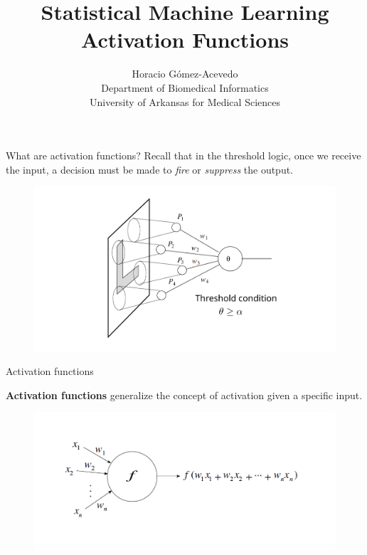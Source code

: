 \documentclass{beamer}
\title{Statistical Machine Learning\\ Activation Functions}
\author{Horacio G\'omez-Acevedo\\ Department of Biomedical Informatics\\
	University of Arkansas for Medical Sciences}
\begin{document}
	\begin{frame}[plain]
		\maketitle
	\end{frame}

\begin{frame}{What are activation functions?}
Recall that in the threshold logic,  once we receive the input, a decision must be made to \textit{fire} or \textit{suppress} the output. 

\begin{figure}[h]
	\centering
	\includegraphics[scale=0.8]{../../Figures/fig_threshold.png}
\end{figure}

\end{frame}
\begin{frame}{Activation functions}
	


\textbf{Activation functions} generalize the concept of activation given a specific  input.

\begin{figure}[h]
	\centering
	\includegraphics[scale=0.8]{../../Figures/fig_activation.png}
\end{figure}
	
\end{frame}
\end{document}
